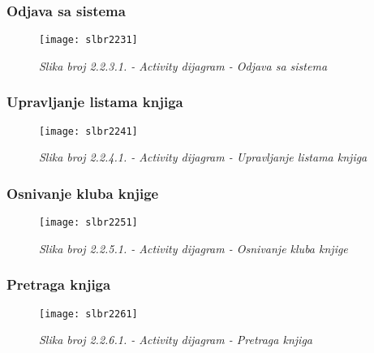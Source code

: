 \documentclass[a4paper oneside ,12pt]{article}
\begin{document}
\subsubsection{Odjava sa sistema }
\begin{center}
\begin{figure}[H] 
\begin{center}
\texttt{[image: slbr2231]}
\caption*{\textit{Slika broj 2.2.3.1. - Activity dijagram - Odjava sa sistema}}
\end{center}
\end{figure}
\end{center}

\subsubsection{Upravljanje listama knjiga}
\begin{center}
\begin{figure}[H] 
\begin{center}
\texttt{[image: slbr2241]}
\caption*{\textit{Slika broj 2.2.4.1. - Activity dijagram - Upravljanje listama knjiga}}
\end{center}
\end{figure}
\end{center}

\subsubsection{Osnivanje kluba knjige}
\begin{center}
\begin{figure}[H] 
\begin{center}
\texttt{[image: slbr2251]}
\caption*{\textit{Slika broj 2.2.5.1. - Activity dijagram - Osnivanje kluba knjige}}
\end{center}
\end{figure}
\end{center}

\subsubsection{Pretraga knjiga}
\begin{center}
\begin{figure}[H] 
\begin{center}
\texttt{[image: slbr2261]}
\caption*{\textit{Slika broj 2.2.6.1. - Activity dijagram - Pretraga knjiga}}
\end{center}
\end{figure}
\end{center}
\end{document}
